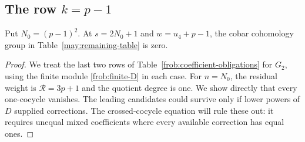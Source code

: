 \subsection{The row \texorpdfstring{$k=p-1$}{k=p-1}}

\begin{proposition}[The row $k=p-1$]\label{frob:kpminus1}
Put $N_0=(p-1)^2$.  At $s=2N_0+1$ and
$w=u_4+p-1$, the cobar cohomology group in
Table~\ref{may:remaining-table} is zero.
\end{proposition}

\begin{proof}
We treat the last two rows of Table~\ref{frob:coefficient-obligations}
for $G_2$, using the finite module \eqref{frob:finite-D} in each case.
For $n=N_0$, the residual weight is $\mathcal R=3p+1$ and the quotient
degree is one.  We show directly that every one-cocycle vanishes.
The leading candidates could survive only if lower powers of $D$
supplied corrections.  The crossed-cocycle equation will rule these out:
it requires unequal mixed coefficients where every available correction
has equal ones.


\end{proof}
